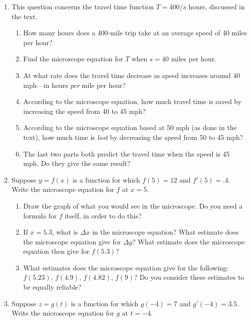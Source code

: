 \begin{enumerate}
\begin{enumerate}
\end{enumerate}
\item This question concerns the travel time function $T = 400/s$
hours, discussed in the text.

  \begin{enumerate}
  \item How many hours does a 400-mile trip take at an average speed of
40 miles per hour?

  \item Find the microscope equation for $T$ when $s = 40$ miles per
hour.

  \item At what rate does the travel time decrease as speed increases
around 40 mph---in hours {\em per\/} mile per hour?

  \item According to the microscope equation, how much travel time is
saved by increasing the speed from 40 to 45 mph?

  \item According to the microscope equation based at 50 mph (as done in
the text), how much time is {\em lost\/} by decreasing the speed from
50 to 45 mph?

  \item The last two parts both predict the travel time when the speed is
45 mph.  Do they give the same result?


\end{enumerate}
\item Suppose $y = f(x)$ is a function for which $f(5) = 12$ and
$f'(5) = .4$.  Write the microscope equation for $f$ at $x = 5$.

  \begin{enumerate}
  \item Draw the graph of what you would see in the microscope.  Do you
need a formula for $f$ itself, in order to do this?

  \item If $x = 5.3$, what is $\Delta x$ in the microscope equation?
What estimate does the microscope equation give for $\Delta y$?  What
estimate does the microscope equation then give for $f(5.3)$?

  \item What estimates does the microscope equation give for the
following: $f(5.23)$, $f(4.9)$, $f(4.82)$, $f(9)$?  Do you consider
these estimates to be equally reliable?



\end{enumerate}
\item Suppose $z = g(t)$ is a function for which $g(-4) = 7$ and
$g'(-4) = 3.5$.  Write the microscope equation for $g$ at $t = -4$.


\end{enumerate}
